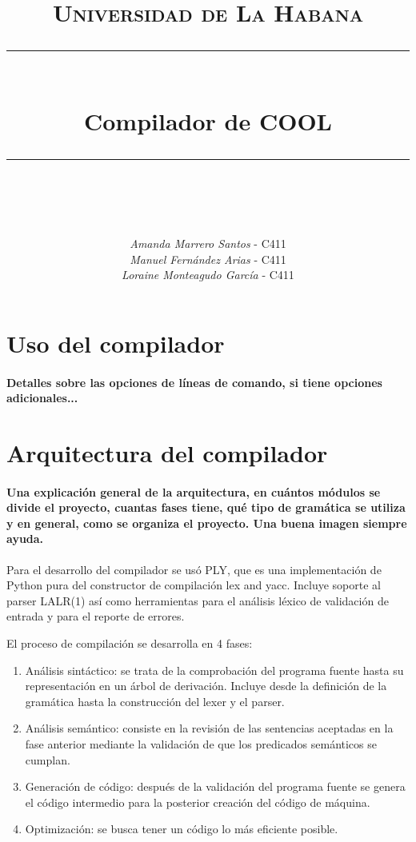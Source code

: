 \documentclass[11pt]{scrartcl} %
\title{	
	\normalfont\normalsize
	\textsc{Universidad de La Habana}\\ %
	\vspace{25pt} %
	\rule{\linewidth}{0.5pt}\\ %
	\vspace{20pt} %
	{\huge Compilador de COOL}\\ %
	\vspace{12pt} %
	\rule{\linewidth}{2pt}\\ %
	\vspace{12pt} %
}
\author{\textit{Amanda Marrero Santos} - C411 \\ \textit{Manuel Fernández Arias} - C411 \\ \textit{Loraine Monteagudo García} - C411 } %
\date{} %
\begin{document}
\maketitle %


\section{Uso del compilador}

\paragraph*{Detalles sobre las opciones de líneas de comando, si tiene opciones adicionales...}


\section{Arquitectura del compilador}

\paragraph*{Una explicación general de la arquitectura, en cuántos módulos se divide el proyecto, cuantas fases tiene, qué tipo de gramática se utiliza y en general, como se organiza el proyecto. Una buena imagen siempre ayuda.}


Para el desarrollo del compilador se usó PLY, que es una implementación de Python pura del constructor de compilación lex and yacc. Incluye soporte al parser LALR(1) así como herramientas para el análisis léxico de validación de entrada y para el reporte de errores.

El proceso de compilación se desarrolla en 4 fases: 

\begin{enumerate}
	\item Análisis sintáctico: se trata de la comprobación del programa fuente hasta su representación en un árbol de derivación. Incluye desde la definición de la gramática hasta la construcción del lexer y el parser.
	\item Análisis semántico: consiste en la revisión de las sentencias aceptadas en la fase anterior mediante la validación de que los predicados semánticos se cumplan. 
	\item Generación de código: después de la validación del programa fuente se genera el código intermedio para la posterior creación del código de máquina.
	\item Optimización: se busca tener un código lo más eficiente posible.
\end{enumerate}
\end{document}
